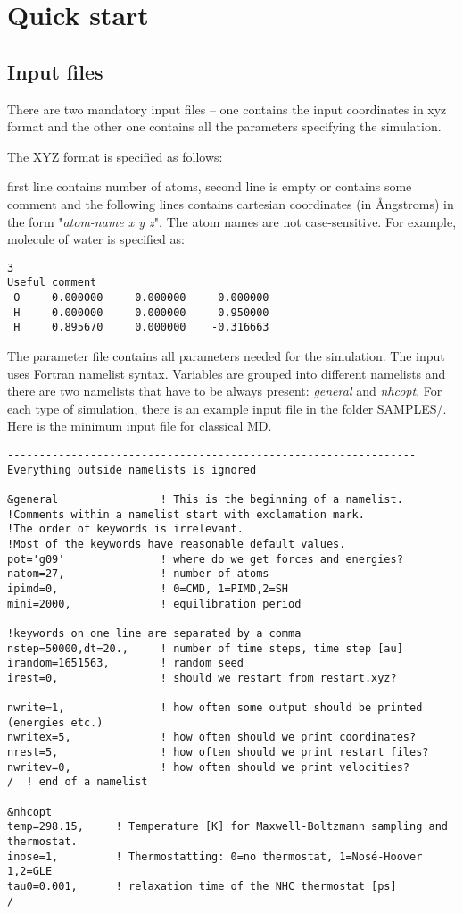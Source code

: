 \section{Quick start}
\subsection{Input files}

There are two mandatory input files -- one contains the input coordinates in xyz format and the other one contains all the parameters specifying the simulation.

The XYZ format is specified as follows:

first line contains number of atoms, second line is empty or contains some comment and the following lines contains cartesian coordinates (in \AA ngstroms) in the form "\textit{atom-name	x y z}". The atom names are not case-sensitive. For example, molecule of water is specified as:

\begin{verbatim}
3
Useful comment
 O     0.000000     0.000000     0.000000
 H     0.000000     0.000000     0.950000
 H     0.895670     0.000000    -0.316663
\end{verbatim}

The parameter file contains all parameters needed for the simulation.
The input uses Fortran namelist syntax.
Variables are grouped into different namelists and there are two namelists that have to be always present: \textit{general} and \textit{nhcopt}. For each type of simulation, there is an example input file in
the folder SAMPLES/. Here is the minimum input file for classical MD.

\begin{verbatim}
----------------------------------------------------------------
Everything outside namelists is ignored

&general                ! This is the beginning of a namelist.
!Comments within a namelist start with exclamation mark.
!The order of keywords is irrelevant.
!Most of the keywords have reasonable default values.
pot='g09'               ! where do we get forces and energies?
natom=27,               ! number of atoms
ipimd=0,                ! 0=CMD, 1=PIMD,2=SH
mini=2000,              ! equilibration period

!keywords on one line are separated by a comma
nstep=50000,dt=20.,     ! number of time steps, time step [au]
irandom=1651563,        ! random seed
irest=0,                ! should we restart from restart.xyz?

nwrite=1,               ! how often some output should be printed (energies etc.)
nwritex=5,              ! how often should we print coordinates?
nrest=5,                ! how often should we print restart files?
nwritev=0,              ! how often should we print velocities?
/  ! end of a namelist

&nhcopt
temp=298.15,     ! Temperature [K] for Maxwell-Boltzmann sampling and thermostat.
inose=1,         ! Thermostatting: 0=no thermostat, 1=Nosé-Hoover 1,2=GLE
tau0=0.001,      ! relaxation time of the NHC thermostat [ps]
/

\end{verbatim}

